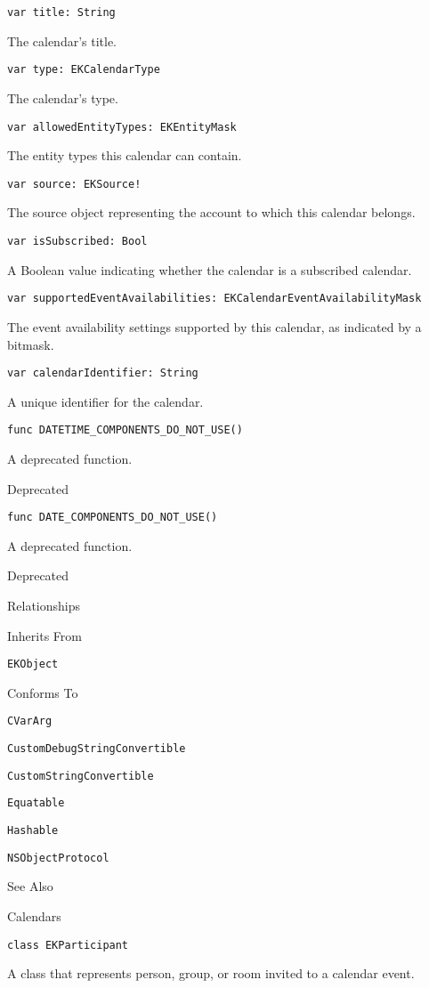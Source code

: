 \documentclass{article}
\begin{document}
\texttt{var title: String}

The calendar's title.

\texttt{var type: EKCalendarType}

The calendar's type.

\texttt{var allowedEntityTypes: EKEntityMask}

The entity types this calendar can contain.

\texttt{var source: EKSource!}

The source object representing the account to which this calendar belongs.

\texttt{var isSubscribed: Bool}

A Boolean value indicating whether the calendar is a subscribed calendar.

\texttt{var supportedEventAvailabilities: EKCalendarEventAvailabilityMask}

The event availability settings supported by this calendar, as indicated by a bitmask.

\texttt{var calendarIdentifier: String}

A unique identifier for the calendar.

\texttt{func DATETIME\_COMPONENTS\_DO\_NOT\_USE()}

A deprecated function.

Deprecated

\texttt{func DATE\_COMPONENTS\_DO\_NOT\_USE()}

A deprecated function.

Deprecated

Relationships

Inherits From

\texttt{EKObject}

Conforms To

\texttt{CVarArg}

\texttt{CustomDebugStringConvertible}

\texttt{CustomStringConvertible}

\texttt{Equatable}

\texttt{Hashable}

\texttt{NSObjectProtocol}

See Also

Calendars

\texttt{class EKParticipant}

A class that represents person, group, or room invited to a calendar event.

\newpage
\end{document}
